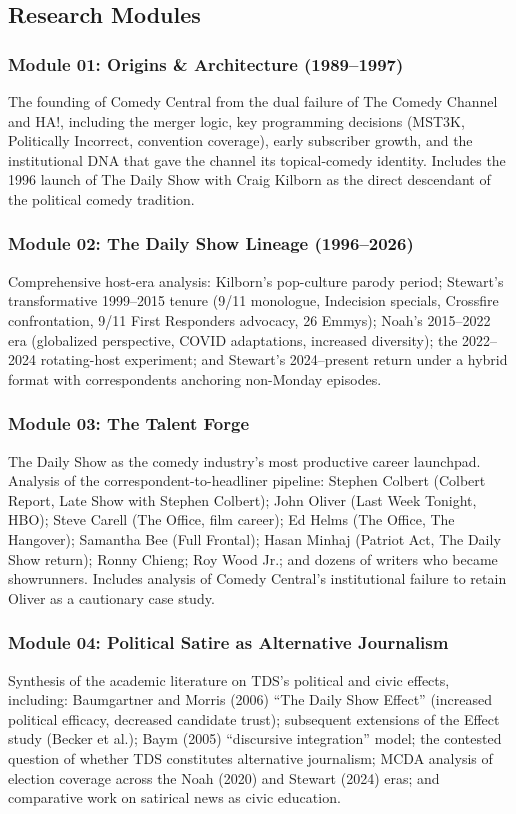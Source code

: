 \documentclass[11pt,letterpaper]{article}
\begin{document}
\subsection{Research Modules}

\subsubsection{Module 01: Origins \& Architecture (1989--1997)}
The founding of Comedy Central from the dual failure of The Comedy Channel and HA!, including the merger logic, key programming decisions (MST3K, Politically Incorrect, convention coverage), early subscriber growth, and the institutional DNA that gave the channel its topical-comedy identity. Includes the 1996 launch of The Daily Show with Craig Kilborn as the direct descendant of the political comedy tradition.

\subsubsection{Module 02: The Daily Show Lineage (1996--2026)}
Comprehensive host-era analysis: Kilborn's pop-culture parody period; Stewart's transformative 1999--2015 tenure (9/11 monologue, Indecision specials, Crossfire confrontation, 9/11 First Responders advocacy, 26 Emmys); Noah's 2015--2022 era (globalized perspective, COVID adaptations, increased diversity); the 2022--2024 rotating-host experiment; and Stewart's 2024--present return under a hybrid format with correspondents anchoring non-Monday episodes.

\subsubsection{Module 03: The Talent Forge}
The Daily Show as the comedy industry's most productive career launchpad. Analysis of the correspondent-to-headliner pipeline: Stephen Colbert (Colbert Report, Late Show with Stephen Colbert); John Oliver (Last Week Tonight, HBO); Steve Carell (The Office, film career); Ed Helms (The Office, The Hangover); Samantha Bee (Full Frontal); Hasan Minhaj (Patriot Act, The Daily Show return); Ronny Chieng; Roy Wood Jr.; and dozens of writers who became showrunners. Includes analysis of Comedy Central's institutional failure to retain Oliver as a cautionary case study.

\subsubsection{Module 04: Political Satire as Alternative Journalism}
Synthesis of the academic literature on TDS's political and civic effects, including: Baumgartner and Morris (2006) ``The Daily Show Effect'' (increased political efficacy, decreased candidate trust); subsequent extensions of the Effect study (Becker et al.); Baym (2005) ``discursive integration'' model; the contested question of whether TDS constitutes alternative journalism; MCDA analysis of election coverage across the Noah (2020) and Stewart (2024) eras; and comparative work on satirical news as civic education.
\end{document}
